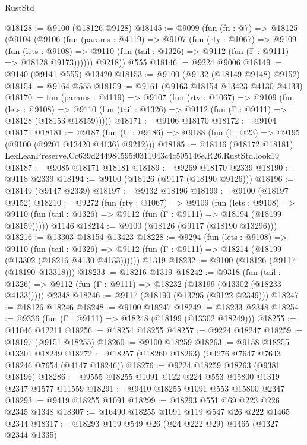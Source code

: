 \begin{lexlean}{RustStd}
\begin{coremodule}
@18128 := @9100 (@18126 @9128)
@18145 := @9099
    (fun (fn : @7) =>
    @18125
      (@9104
        (@9106
          (fun (params : @4119) =>
          @9107
            (fun (rty : @1067) =>
            @9109
              (fun (lets : @9108) =>
              @9110 (fun (tail : @1326) => @9112 (fun (Γ : @9111) => @18128 @9173))))))
        @9218))
    @555
@18146 := @9224 @9006
@18149 := @9140 (@9141 @555) @13420
@18153 := @9100 (@9132 (@18149 @9148) @9152)
@18154 := @9164 @555
@18159 := @9161 (@9163 @18154 @13423 @4130 @4133)
@18170 := fun (params : @4119) =>
  @9107
    (fun (rty : @1067) =>
    @9109
      (fun (lets : @9108) =>
      @9110 (fun (tail : @1326) => @9112 (fun (Γ : @9111) => @18128 (@18153 @18159)))))
@18171 := @9106 @18170
@18172 := @9104 @18171
@18181 := @9187
    (fun (U : @9186) => @9188 (fun (t : @23) => @9195 (@9100 (@9201 @13420 @4136) @9212)))
@18185 := @18146
    (@18172 @18181)
    LexLeanPreserve.Cc639d244984595f0311043c4c505146e.R26.RustStd.look19
@18187 := @9085 @18171 @18181
@18189 := @9269 @18170 @2339
@18190 := @9118 @2339
@18194 := @9100 (@18126 (@9117 (@18190 @9126)))
@18196 := @18149 (@9147 @2339)
@18197 := @9132 @18196
@18199 := @9100 (@18197 @9152)
@18210 := @9272
    (fun (rty : @1067) =>
    @9109
      (fun (lets : @9108) =>
      @9110 (fun (tail : @1326) => @9112 (fun (Γ : @9111) => @18194 (@18199 @18159)))))
    @1146
@18214 := @9100 (@18126 (@9117 (@18190 @13296)))
@18216 := @13303 @18154 @13423
@18228 := @9294
    (fun (lets : @9108) =>
    @9110
      (fun (tail : @1326) =>
      @9112 (fun (Γ : @9111) => @18214 (@18199 (@13302 (@18216 @4130 @4133))))))
    @1319
@18232 := @9100 (@18126 (@9117 (@18190 @13318)))
@18233 := @18216 @1319
@18242 := @9318
    (fun (tail : @1326) => @9112 (fun (Γ : @9111) => @18232 (@18199 (@13302 (@18233 @4133)))))
    @2348
@18246 := @9117 (@18190 (@13295 (@9122 @2349)))
@18247 := @18126 @18246
@18248 := @9100 @18247
@18249 := @18233 @2348
@18254 := @9336 (fun (Γ : @9111) => @18248 (@18199 (@13302 @18249)))
@18255 := @11046 @12211
@18256 := @18254 @18255
@18257 := @9224 @18247
@18259 := @18197 (@9151 @18255)
@18260 := @9100 @18259
@18263 := @9158 @18255 @13301 @18249
@18272 := @18257 (@18260 @18263) (@4276 @7647 @7643 @18246 @7654 (@4147 @18246))
@18276 := @9224 @18259 @18263 (@9381 @18196)
@18286 := @9555 @18255 @1091 @122 @224 @553 @15800 @1319 @2347 @1577 @11559
@18291 := @9410 @18255 @1091 @553 @15800 @2347
@18293 := @9419 @18255 @1091
@18299 := @18293 @551 @69 @223 @226 @2345 @1348
@18307 := @16490 @18255 @1091 @119 @547 @26 @222 @1465 @2344
@18317 := @18293 @119 @549 @26 (@24 @222 @29) @1465 (@1327 @2344 @1335)

\end{coremodule}
\end{lexlean}
